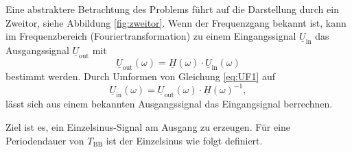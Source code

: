 \documentclass[12pt,report,final,twoside,accentcolor=tud9b,bigchapter]{tudreport}
\begin{document}
Eine abstraktere Betrachtung des Problems führt auf die Darstellung durch ein Zweitor, siehe Abbildung \ref{fig:zweitor}.
Wenn der Frequenzgang bekannt ist, kann im Frequenzbereich (Fouriertransformation) zu einem Eingangssignal $\underline{U}_{\mathrm{in}}$ das Ausgangssignal $\underline{U}_{\mathrm{out}}$ mit 
\begin{equation}
\underline{U}_{\mathrm{out}}(\omega)=\underline{H}(\omega)\cdot \underline{U}_{\mathrm{in}}(\omega)
\label{eq:UF1}
\end{equation}
bestimmt werden. Durch Umformen von Gleichung \eqref{eq:UF1} auf \begin{equation}
\underline{U}_{\mathrm{in}}(\omega)=\underline{U}_{\mathrm{out}}(\omega)\cdot \underline{H}(\omega)^{-1},
\label{eq:UF2}
\end{equation}
lässt sich aus einem bekannten Ausgangssignal das Eingangsignal berrechnen. \cite{Frey2015}

Ziel ist es, ein Einzelsinus-Signal am Ausgang zu erzeugen. Für eine Periodendauer von $T_{\mathrm{BB}}$ ist der Einzelsinus wie folgt definiert. \cite{Harzheim2017}
\end{document}
